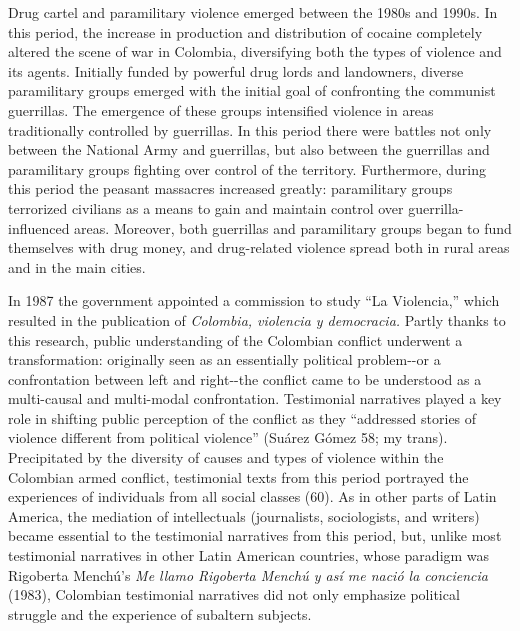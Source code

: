 \documentclass[
  11pt,
,
onecolumn,
openany
]{book}
\begin{document}
Drug cartel and paramilitary violence emerged between the 1980s and 1990s. In
this period, the increase in production and distribution of cocaine completely
altered the scene of war in Colombia, diversifying both the types of violence
and its agents. Initially funded by powerful drug lords and landowners,
diverse paramilitary groups emerged with the initial goal of confronting the
communist guerrillas. The emergence of these groups intensified violence in
areas traditionally controlled by guerrillas. In this period there were
battles not only between the National Army and guerrillas, but also between
the guerrillas and paramilitary groups fighting over control of the territory.
Furthermore, during this period the peasant massacres increased greatly:
paramilitary groups terrorized civilians as a means to gain and maintain
control over guerrilla-influenced areas. Moreover, both guerrillas and
paramilitary groups began to fund themselves with drug money, and drug-related
violence spread both in rural areas and in the main cities.

In 1987 the government appointed a commission to study ``La Violencia,'' which
resulted in the publication of \emph{Colombia, violencia y democracia.} Partly
thanks to this research, public understanding of the Colombian conflict
underwent a transformation: originally seen as an essentially political
problem-\/-or a confrontation between left and right-\/-the conflict came to
be understood as a multi-causal and multi-modal confrontation. Testimonial
narratives played a key role in shifting public perception of the conflict as
they ``addressed stories of violence different from political violence''
(Suárez Gómez 58; my trans). Precipitated by the diversity of causes and types
of violence within the Colombian armed conflict, testimonial texts from this
period portrayed the experiences of individuals from all social classes (60).
As in other parts of Latin America, the mediation of intellectuals
(journalists, sociologists, and writers) became essential to the testimonial
narratives from this period, but, unlike most testimonial narratives in other
Latin American countries, whose paradigm was Rigoberta Menchú's \emph{Me llamo
Rigoberta Menchú y así me nació la conciencia} (1983), Colombian testimonial
narratives did not only emphasize political struggle and the experience of
subaltern subjects.
\end{document}
